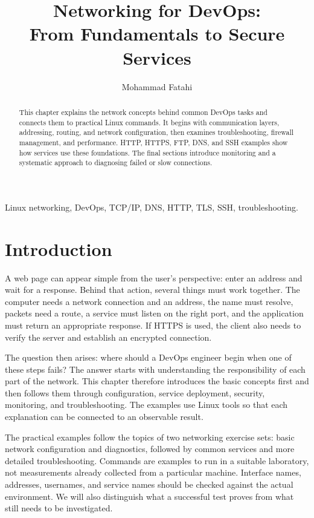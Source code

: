\documentclass[journal]{IEEEtran}
\begin{document}
\title{Networking for DevOps:\\From Fundamentals to Secure Services}
\author{Mohammad Fatahi}
\maketitle

\begin{abstract}
This chapter explains the network concepts behind common DevOps tasks and connects them to practical Linux commands. It begins with communication layers, addressing, routing, and network configuration, then examines troubleshooting, firewall management, and performance. HTTP, HTTPS, FTP, DNS, and SSH examples show how services use these foundations. The final sections introduce monitoring and a systematic approach to diagnosing failed or slow connections.
\end{abstract}
\begin{IEEEkeywords}
Linux networking, DevOps, TCP/IP, DNS, HTTP, TLS, SSH, troubleshooting.
\end{IEEEkeywords}

\section{Introduction}
A web page can appear simple from the user's perspective: enter an address and wait for a response. Behind that action, several things must work together. The computer needs a network connection and an address, the name must resolve, packets need a route, a service must listen on the right port, and the application must return an appropriate response. If HTTPS is used, the client also needs to verify the server and establish an encrypted connection.

The question then arises: where should a DevOps engineer begin when one of these steps fails? The answer starts with understanding the responsibility of each part of the network. This chapter therefore introduces the basic concepts first and then follows them through configuration, service deployment, security, monitoring, and troubleshooting. The examples use Linux tools so that each explanation can be connected to an observable result.

The practical examples follow the topics of two networking exercise sets: basic network configuration and diagnostics, followed by common services and more detailed troubleshooting. Commands are examples to run in a suitable laboratory, not measurements already collected from a particular machine. Interface names, addresses, usernames, and service names should be checked against the actual environment. We will also distinguish what a successful test proves from what still needs to be investigated.
\end{document}
